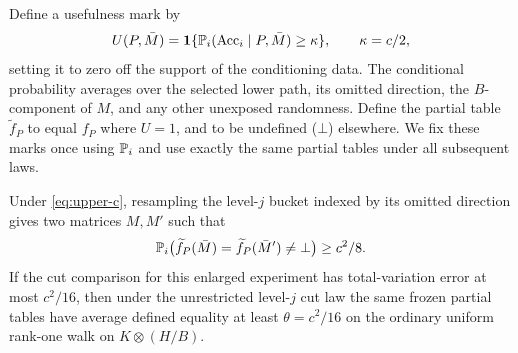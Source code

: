 Define a usefulness mark by
\begin{equation}\label{eq:upper-mark}
 U(P,\bar M)=\mathbf 1\{\mathbb P_i(\mathrm{Acc}_i\mid P,\bar M)\ge\kappa\},
 \qquad \kappa=c/2,
\end{equation}
setting it to zero off the support of the conditioning data.  The conditional
probability averages over the selected lower path, its omitted direction,
the $B$-component of $M$, and any other unexposed randomness.  Define the
partial table $\widetilde f_P$ to equal $f_P$ where $U=1$, and to be
undefined ($\bot$) elsewhere.  We fix these marks once using $\mathbb P_i$ and use exactly the same
partial tables under all subsequent laws.

\begin{lemma}
\label{lem:useful-equality}
Under \eqref{eq:upper-c}, resampling the level-$j$ bucket indexed by its
omitted direction gives two matrices $M,M'$ such that
\[
 \mathbb P_i\bigl(\widetilde f_P(\bar M)
      =\widetilde f_P(\bar M')\ne\bot\bigr)\ge c^2/8.
\]
If the cut comparison for this enlarged experiment has total-variation
error at most $c^2/16$, then under the unrestricted level-$j$ cut law the
same frozen partial tables have average defined equality at least
$\theta=c^2/16$ on the ordinary uniform rank-one walk on $K\otimes(H/B)$.
\end{lemma}

